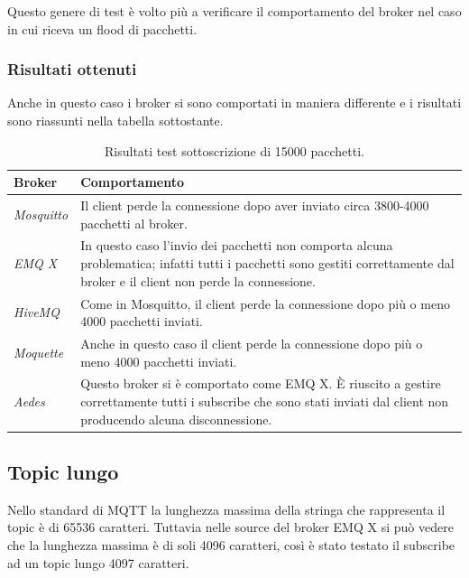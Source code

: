 \documentclass[binding=0.6cm,TFA]{sapthesis}
\begin{document}
\begin{large}
Questo genere di test è volto più a verificare il comportamento del broker nel caso in cui riceva un flood di pacchetti.

\subsubsection{Risultati ottenuti}
Anche in questo caso i broker si sono comportati in maniera differente e i risultati sono riassunti nella tabella sottostante.
\begin{table}[h]
\caption{Risultati test sottoscrizione di 15000 pacchetti.}
\label{tab:results15ksub}
\begin{tabular}{lp{}}
\toprule
\textbf{Broker} & \textbf{Comportamento} \\
\midrule
\textit{Mosquitto} & Il client perde la connessione dopo aver inviato circa 3800-4000 pacchetti al broker. \\
\textit{EMQ X} & In questo caso l'invio dei pacchetti non comporta alcuna problematica; infatti tutti i pacchetti sono gestiti correttamente dal broker e il client non perde la connessione. \\
\textit{HiveMQ} & Come in Mosquitto, il client perde la connessione dopo più o meno 4000 pacchetti inviati. \\
\textit{Moquette} & Anche in questo caso il client perde la connessione dopo più o meno 4000 pacchetti inviati.\\
\textit{Aedes} & Questo broker si è comportato come EMQ X. È riuscito a gestire correttamente tutti i subscribe che sono stati inviati dal client non producendo alcuna disconnessione. \\
\bottomrule
\end{tabular}
\end{table}

\subsection{Topic lungo}
Nello standard di MQTT la lunghezza massima della stringa che rappresenta il topic è di 65536 caratteri. Tuttavia nelle source del broker EMQ X \cite{emqxsource} si può vedere che la lunghezza massima è di soli 4096 caratteri, così è stato testato il subscribe ad un topic lungo 4097 caratteri.


\end{large}
\end{document}
